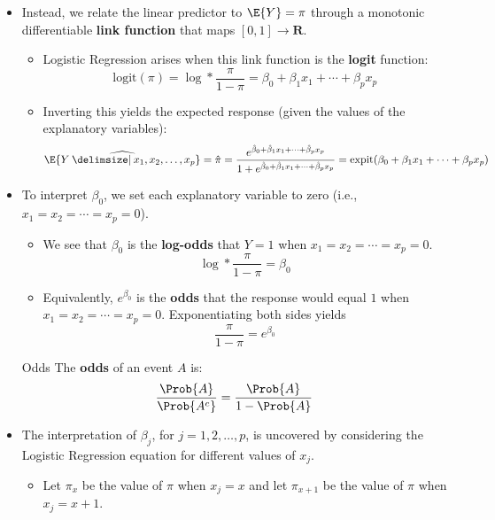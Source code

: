 \begin{itemize}
      \item Instead, we relate the linear predictor to $ \E{Y}=\pi $ through a monotonic differentiable \textbf{link function} that maps $ [0,1]\to\mathbf{R} $.
            \begin{itemize}
                  \item Logistic Regression arises when this link function is the \textbf{logit} function:
                        \[ \text{logit}(\pi)=\log*{\frac{\pi}{1-\pi}}=\beta_0+\beta_1x_1+\cdots+\beta_p x_p \]
                  \item Inverting this yields the expected response (given the values of the explanatory variables):
                        \[ \widehat{\E{Y\given x_1,x_2,\ldots,x_p}}=\hat{\pi}=\frac{e^{\hat{\beta}_0+\hat{\beta}_1 x_1+\cdots+\hat{\beta}_p x_p}}{1+e^{\hat{\beta}_0+\hat{\beta}_1 x_1+\cdots+\hat{\beta}_p x_p}}
                              =\text{expit}(\beta_0+\beta_1x_1+\cdots+\beta_p x_p)  \]
            \end{itemize}
      \item To interpret $ \beta_0 $, we set each explanatory variable to zero (i.e., $ x_1=x_2=\cdots=x_p=0 $).
            \begin{itemize}
                  \item We see that $ \beta_0 $ is the \textbf{log-odds} that $ Y=1 $ when $ x_1=x_2=\cdots=x_p=0 $.
                        \[ \log*{\frac{\pi}{1-\pi}}=\beta_0 \]
                  \item Equivalently, $ e^{\beta_0} $ is the \textbf{odds} that the response would equal $ 1 $ when $ x_1=x_2=\cdots=x_p=0 $.
                        Exponentiating both sides yields
                        \[ \frac{\pi}{1-\pi}=e^{\beta_0}  \]
            \end{itemize}
            \begin{Definition}{Odds}{}
                  The \textbf{odds} of an event $ A $ is:
                  \[ \frac{\Prob{A}}{\Prob{A^c}}=\frac{\Prob{A}}{1-\Prob{A}} \]
            \end{Definition}
      \item The interpretation of $\beta_j$, for $ j=1,2,\ldots,p $, is uncovered by considering the Logistic Regression equation
            for different values of $ x_j $.
            \begin{itemize}
                  \item Let $ \pi_x $ be the value of $ \pi $ when $ x_j=x $ and let $ \pi_{x+1} $ be the value of $ \pi $ when $ x_j=x+1 $.

\end{itemize}
\end{itemize}
